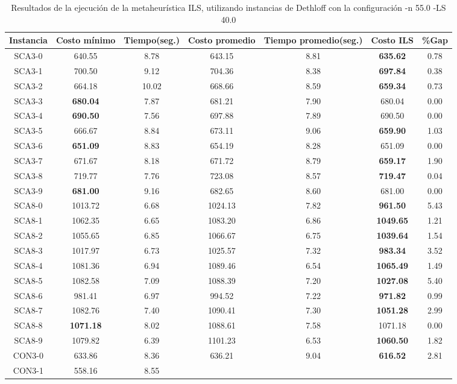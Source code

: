 \begin{table}[ht]
\caption{Resultados de la ejecución de la metaheurística ILS, utilizando instancias de Dethloff con la configuración -n 55.0 -LS 40.0}
\centering
\small
\begin{tabular}{c c c c c c c}
\hline\hline
Instancia & Costo mínimo & Tiempo(seg.) & Costo promedio & Tiempo promedio(seg.) & Costo ILS & \%Gap \\ [0.5ex]
\hline
SCA3-0 & 640.55 & 8.78 & 
643.15 & 8.81 & \bf{635.62} & 
0.78\\SCA3-1 & 700.50 & 9.12 & 
704.36 & 8.38 & \bf{697.84} & 
0.38\\SCA3-2 & 664.18 & 10.02 & 
668.66 & 8.59 & \bf{659.34} & 
0.73\\SCA3-3 & \bf{680.04} & 7.87 & 
681.21 & 7.90 & 680.04 & 0.00\\
SCA3-4 & \bf{690.50} & 7.56 & 
697.88 & 7.89 & 690.50 & 0.00\\
SCA3-5 & 666.67 & 8.84 & 
673.11 & 9.06 & \bf{659.90} & 
1.03\\SCA3-6 & \bf{651.09} & 8.83 & 
654.19 & 8.28 & 651.09 & 0.00\\
SCA3-7 & 671.67 & 8.18 & 
671.72 & 8.79 & \bf{659.17} & 
1.90\\SCA3-8 & 719.77 & 7.76 & 
723.08 & 8.57 & \bf{719.47} & 
0.04\\SCA3-9 & \bf{681.00} & 9.16 & 
682.65 & 8.60 & 681.00 & 0.00\\
SCA8-0 & 1013.72 & 6.68 & 
1024.13 & 7.82 & \bf{961.50} & 
5.43\\SCA8-1 & 1062.35 & 6.65 & 
1083.20 & 6.86 & \bf{1049.65} & 
1.21\\SCA8-2 & 1055.65 & 6.85 & 
1066.67 & 6.75 & \bf{1039.64} & 
1.54\\SCA8-3 & 1017.97 & 6.73 & 
1025.57 & 7.32 & \bf{983.34} & 
3.52\\SCA8-4 & 1081.36 & 6.94 & 
1089.46 & 6.54 & \bf{1065.49} & 
1.49\\SCA8-5 & 1082.58 & 7.09 & 
1088.39 & 7.20 & \bf{1027.08} & 
5.40\\SCA8-6 & 981.41 & 6.97 & 
994.52 & 7.22 & \bf{971.82} & 
0.99\\SCA8-7 & 1082.76 & 7.40 & 
1090.41 & 7.30 & \bf{1051.28} & 
2.99\\SCA8-8 & \bf{1071.18} & 8.02 & 
1088.61 & 7.58 & 1071.18 & 0.00\\
SCA8-9 & 1079.82 & 6.39 & 
1101.23 & 6.53 & \bf{1060.50} & 
1.82\\CON3-0 & 633.86 & 8.36 & 
636.21 & 9.04 & \bf{616.52} & 
2.81\\CON3-1 & 558.16 & 8.55 & 

\end{tabular}
\end{table}
